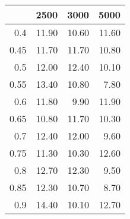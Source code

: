 \begin{table}[ht]
\centering
\begin{tabular}{rrrr}
  \hline
 & 2500 & 3000 & 5000 \\ 
  \hline
0.4 & 11.90 & 10.60 & 11.60 \\ 
  0.45 & 11.70 & 11.70 & 10.80 \\ 
  0.5 & 12.00 & 12.40 & 10.10 \\ 
  0.55 & 13.40 & 10.80 & 7.80 \\ 
  0.6 & 11.80 & 9.90 & 11.90 \\ 
  0.65 & 10.80 & 11.70 & 10.30 \\ 
  0.7 & 12.40 & 12.00 & 9.60 \\ 
  0.75 & 11.30 & 10.30 & 12.60 \\ 
  0.8 & 12.70 & 12.30 & 9.50 \\ 
  0.85 & 12.30 & 10.70 & 8.70 \\ 
  0.9 & 14.40 & 10.10 & 12.70 \\ 
   \hline
\end{tabular}
\end{table}
